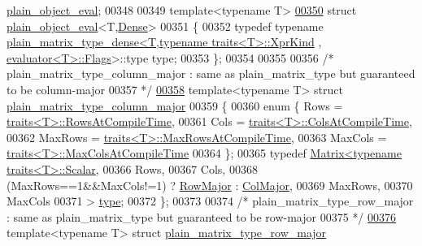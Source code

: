\begin{DoxyCode}
{      \hyperlink{struct_eigen_1_1internal_1_1plain__object__eval}{plain\_object\_eval};
00348 
00349 \textcolor{keyword}{template}<\textcolor{keyword}{typename} T>
\hyperlink{struct_eigen_1_1internal_1_1plain__object__eval_3_01_t_00_01_dense_01_4}{00350} \textcolor{keyword}{struct }\hyperlink{struct_eigen_1_1internal_1_1plain__object__eval}{plain\_object\_eval}<T,\hyperlink{struct_eigen_1_1_dense}{Dense}>
00351 \{
00352   \textcolor{keyword}{typedef} \textcolor{keyword}{typename} \hyperlink{struct_eigen_1_1internal_1_1plain__matrix__type__dense}{plain\_matrix\_type\_dense<T,typename traits<T>::XprKind}
      , \hyperlink{struct_eigen_1_1internal_1_1evaluator}{evaluator<T>::Flags}>::type type;
00353 \};
00354 
00355 
00356 \textcolor{comment}{/* plain\_matrix\_type\_column\_major : same as plain\_matrix\_type but guaranteed to be column-major}
00357 \textcolor{comment}{ */}
\hyperlink{struct_eigen_1_1internal_1_1plain__matrix__type__column__major}{00358} \textcolor{keyword}{template}<\textcolor{keyword}{typename} T> \textcolor{keyword}{struct }\hyperlink{struct_eigen_1_1internal_1_1plain__matrix__type__column__major}{plain\_matrix\_type\_column\_major}
00359 \{
00360   \textcolor{keyword}{enum} \{ Rows = \hyperlink{struct_eigen_1_1internal_1_1traits}{traits<T>::RowsAtCompileTime},
00361          Cols = \hyperlink{struct_eigen_1_1internal_1_1traits}{traits<T>::ColsAtCompileTime},
00362          MaxRows = \hyperlink{struct_eigen_1_1internal_1_1traits}{traits<T>::MaxRowsAtCompileTime},
00363          MaxCols = \hyperlink{struct_eigen_1_1internal_1_1traits}{traits<T>::MaxColsAtCompileTime}
00364   \};
00365   \textcolor{keyword}{typedef} \hyperlink{group___core___module_class_eigen_1_1_matrix}{Matrix<typename traits<T>::Scalar},
00366                 Rows,
00367                 Cols,
00368                 (MaxRows==1&&MaxCols!=1) ? \hyperlink{group__enums_ggaacded1a18ae58b0f554751f6cdf9eb13acfcde9cd8677c5f7caf6bd603666aae3}{RowMajor} : \hyperlink{group__enums_ggaacded1a18ae58b0f554751f6cdf9eb13a0cbd4bdd0abcfc0224c5fcb5e4f6669a}{ColMajor},
00369                 MaxRows,
00370                 MaxCols
00371           > \hyperlink{group___core___module_class_eigen_1_1_matrix}{type};
00372 \};
00373 
00374 \textcolor{comment}{/* plain\_matrix\_type\_row\_major : same as plain\_matrix\_type but guaranteed to be row-major}
00375 \textcolor{comment}{ */}
\hyperlink{struct_eigen_1_1internal_1_1plain__matrix__type__row__major}{00376} \textcolor{keyword}{template}<\textcolor{keyword}{typename} T> \textcolor{keyword}{struct }\hyperlink{struct_eigen_1_1internal_1_1plain__matrix__type__row__major}{plain\_matrix\_type\_row\_major}
}
\end{DoxyCode}
